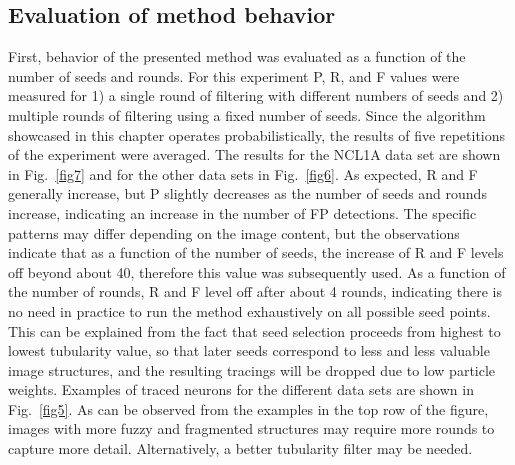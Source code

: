 \subsection{Evaluation of method behavior} 
\label{subsec:evaluation-of-method-behavior}
First, behavior of the presented method was evaluated as a function of the number of seeds and rounds. For this experiment P, R, and F values were measured for 1) a single round of filtering with different numbers of seeds and 2) multiple rounds of filtering using a fixed number of seeds. Since the algorithm showcased in this chapter operates probabilistically, the results of five repetitions of the experiment were averaged. The results for the NCL1A data set are shown in Fig.~\ref{fig7} and for the other data sets in Fig.~\ref{fig6}. As expected, R and F generally increase, but P slightly decreases as the number of seeds and rounds increase, indicating an increase in the number of FP detections. The specific patterns may differ depending on the image content, but the observations indicate that as a function of the number of seeds, the increase of R and F levels off beyond about 40, therefore this value was subsequently used. As a function of the number of rounds, R and F level off after about 4 rounds, indicating there is no need in practice to run the method exhaustively on all possible seed points. This can be explained from the fact that seed selection proceeds from highest to lowest tubularity value, so that later seeds correspond to less and less valuable image structures, and the resulting tracings will be dropped due to low particle weights. Examples of traced neurons for the different data sets are shown in Fig.~\ref{fig5}. As can be observed from the examples in the top row of the figure, images with more fuzzy and fragmented structures may require more rounds to capture more detail. Alternatively, a better tubularity filter may be needed.

